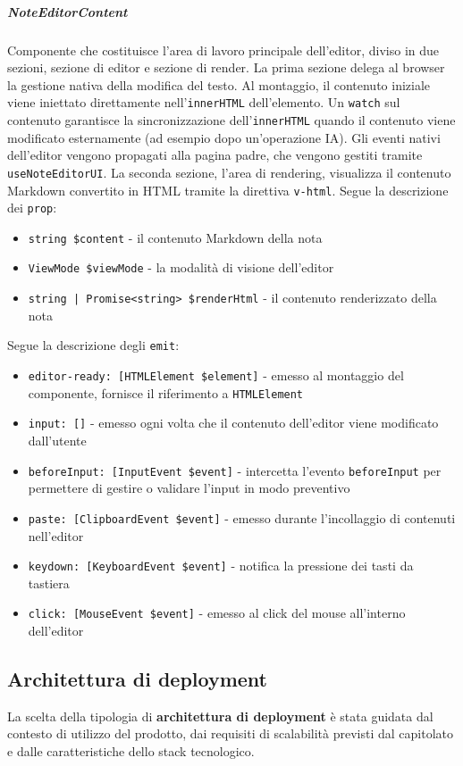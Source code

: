 \documentclass[a4paper,10pt]{article}
\begin{document}
\subparagraph{NoteEditorContent} Componente che costituisce l'area di lavoro principale dell'editor, diviso in due sezioni, sezione di editor e sezione di render. La prima sezione delega al browser la gestione nativa della modifica del testo. Al montaggio, il contenuto iniziale viene iniettato direttamente nell'\texttt{innerHTML} dell'elemento. Un \texttt{watch} sul contenuto garantisce la sincronizzazione dell'\texttt{innerHTML} quando il contenuto viene modificato esternamente (ad esempio dopo un'operazione IA). Gli eventi nativi dell'editor vengono propagati alla pagina padre, che vengono gestiti tramite \texttt{useNoteEditorUI}. La seconda sezione, l'area di rendering, visualizza il contenuto Markdown convertito in HTML tramite la direttiva \texttt{v-html}.  Segue la descrizione dei \texttt{prop}:
\begin{itemize}
    \item \texttt{string \$content} - il contenuto Markdown della nota
    \item \texttt{ViewMode \$viewMode} - la modalità di visione dell'editor
    \item \texttt{string | Promise<string> \$renderHtml} - il contenuto renderizzato della nota
\end{itemize}
Segue la descrizione degli \texttt{emit}:
\begin{itemize}
    \item \texttt{editor-ready: [HTMLElement \$element]} - emesso al montaggio del componente, fornisce il riferimento a \texttt{HTMLElement}
    \item \texttt{input: []} - emesso ogni volta che il contenuto dell'editor viene modificato dall'utente
    \item \texttt{beforeInput: [InputEvent \$event]} - intercetta l'evento \texttt{beforeInput} per permettere di gestire o validare l'input in modo preventivo
    \item \texttt{paste: [ClipboardEvent \$event]} - emesso durante l'incollaggio di contenuti nell'editor
    \item \texttt{keydown: [KeyboardEvent \$event]} - notifica la pressione dei tasti da tastiera
    \item \texttt{click: [MouseEvent \$event]} - emesso al click del mouse all'interno dell'editor
\end{itemize}

\subsection{Architettura di deployment}
La scelta della tipologia di \textbf{architettura di deployment} è stata guidata dal contesto di utilizzo del prodotto, dai requisiti di scalabilità previsti dal capitolato e dalle caratteristiche dello stack tecnologico.
\end{document}
